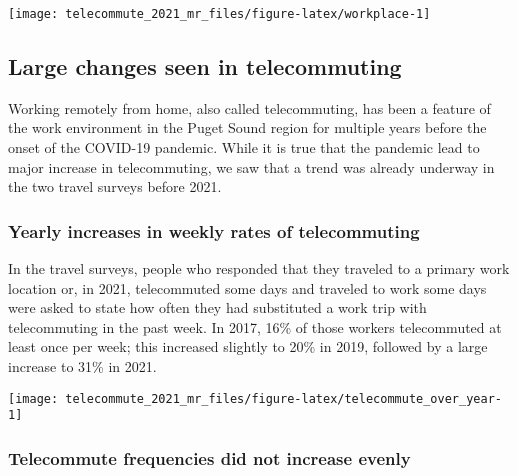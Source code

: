 \documentclass[
  12pt,
]{article}
\begin{document}
\begin{center}\texttt{[image: telecommute\_2021\_mr\_files/figure-latex/workplace-1]} \end{center}

\hypertarget{large-changes-seen-in-telecommuting}{%
\subsection{Large changes seen in
telecommuting}\label{large-changes-seen-in-telecommuting}}

\begin{flushleft}
Working remotely from home, also called telecommuting, has been a feature of the work environment in the Puget Sound region for multiple years before the onset of the COVID-19 pandemic. While it is true that the pandemic lead to major increase in telecommuting, we saw that a trend was already underway in the two travel surveys before 2021.
\end{flushleft}

\hypertarget{yearly-increases-in-weekly-rates-of-telecommuting}{%
\subsubsection{Yearly increases in weekly rates of
telecommuting}\label{yearly-increases-in-weekly-rates-of-telecommuting}}

\begin{flushleft}
In the travel surveys, people who responded that they traveled to a primary work location or, in 2021, telecommuted some days and traveled to work some days were asked to state how often they had substituted a work trip with telecommuting in the past week. In 2017, 16\% of those workers telecommuted at least once per week; this increased slightly to 20\% in 2019, followed by a large increase to 31\% in 2021.
\end{flushleft}

\begin{center}\texttt{[image: telecommute\_2021\_mr\_files/figure-latex/telecommute\_over\_year-1]} \end{center}

\hypertarget{telecommute-frequencies-did-not-increase-evenly}{%
\subsubsection{Telecommute frequencies did not increase
evenly}\label{telecommute-frequencies-did-not-increase-evenly}}
\end{document}
